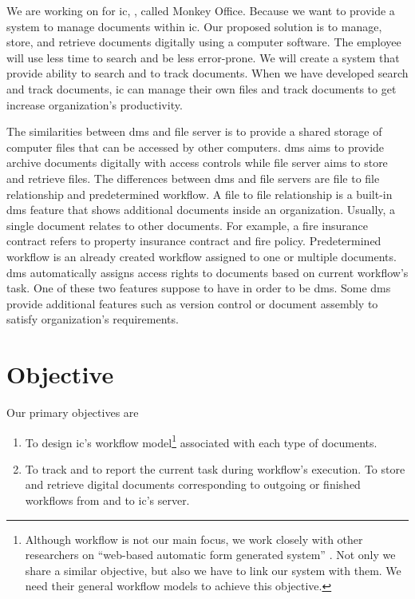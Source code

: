 We are working on \MakeLowercase{\projTitle} for \gls{ic}, \kmitl, called Monkey Office. Because we want to provide a system to manage documents within \gls{ic}. Our proposed solution is to manage, store, and retrieve documents digitally using a computer software.
The employee will use less time to search and be less error-prone.
We will create a system that provide ability to search and to track documents.
When we have developed search and track documents, \gls{ic} can manage their own files and track documents to get increase organization's productivity. 

The similarities between \gls{dms} and file server is to provide a shared storage of computer files that can be accessed by other computers.
\gls{dms} aims to provide archive documents digitally with access controls while file server aims to store and retrieve files.
The differences between \gls{dms} and file servers are file to file relationship and predetermined workflow.
A file to file relationship is a built-in \gls{dms} feature that shows additional documents inside an organization.
Usually, a single document relates to other documents.
For example, a fire insurance contract refers to property insurance contract and fire policy.
Predetermined workflow is an already created workflow assigned to one or multiple documents.
\gls{dms} automatically assigns access rights to documents based on current workflow's task.
One of these two features suppose to have in order to be \gls{dms}.
Some \gls{dms} provide additional features such as version control or document assembly to satisfy organization's requirements.

\section{Objective}
\label{sec:objective}
Our primary objectives are
\begin{enumerate}
\item To design \gls{ic}'s workflow model\footnote{
	Although workflow is not our main focus, we work closely with other researchers on \enquote{web-based automatic form generated system} \cite{web-based-form}.
	Not only we share a similar objective, but also we have to link our system with them.
	We need their general workflow models to achieve this objective.
} associated with each type of documents.
\item To track and to report the current task during workflow's execution. To store and retrieve digital documents corresponding to outgoing or finished workflows from and to \gls{ic}'s server.
\end{enumerate}

